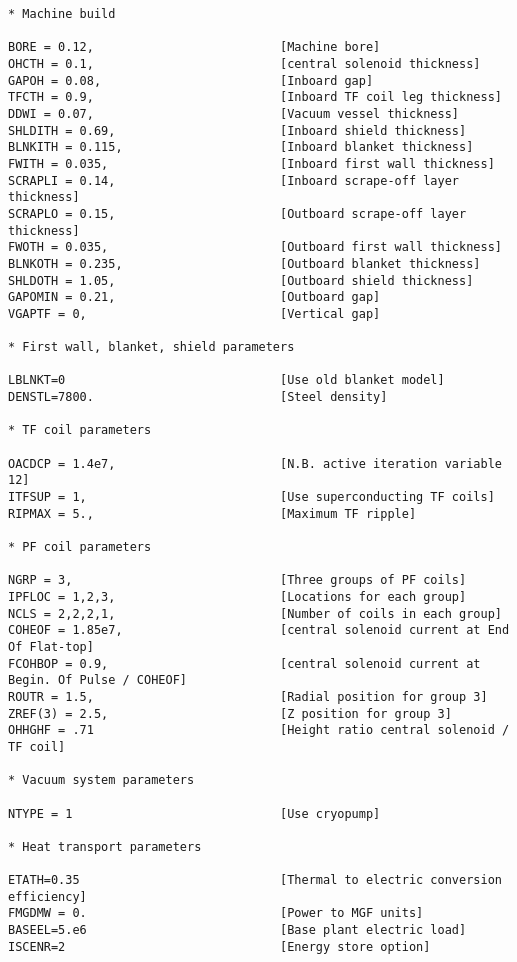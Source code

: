 \documentclass[11pt,a4paper]{report}
\begin{document}
\begin{verbatim}
* Machine build

BORE = 0.12,                          [Machine bore]
OHCTH = 0.1,                          [central solenoid thickness]
GAPOH = 0.08,                         [Inboard gap]
TFCTH = 0.9,                          [Inboard TF coil leg thickness]
DDWI = 0.07,                          [Vacuum vessel thickness]
SHLDITH = 0.69,                       [Inboard shield thickness]
BLNKITH = 0.115,                      [Inboard blanket thickness]
FWITH = 0.035,                        [Inboard first wall thickness]
SCRAPLI = 0.14,                       [Inboard scrape-off layer thickness]
SCRAPLO = 0.15,                       [Outboard scrape-off layer thickness]
FWOTH = 0.035,                        [Outboard first wall thickness]
BLNKOTH = 0.235,                      [Outboard blanket thickness]
SHLDOTH = 1.05,                       [Outboard shield thickness]
GAPOMIN = 0.21,                       [Outboard gap]
VGAPTF = 0,                           [Vertical gap]

* First wall, blanket, shield parameters

LBLNKT=0                              [Use old blanket model]
DENSTL=7800.                          [Steel density]

* TF coil parameters

OACDCP = 1.4e7,                       [N.B. active iteration variable 12]
ITFSUP = 1,                           [Use superconducting TF coils]
RIPMAX = 5.,                          [Maximum TF ripple]

* PF coil parameters

NGRP = 3,                             [Three groups of PF coils]
IPFLOC = 1,2,3,                       [Locations for each group]
NCLS = 2,2,2,1,                       [Number of coils in each group]
COHEOF = 1.85e7,                      [central solenoid current at End Of Flat-top]
FCOHBOP = 0.9,                        [central solenoid current at Begin. Of Pulse / COHEOF]
ROUTR = 1.5,                          [Radial position for group 3]
ZREF(3) = 2.5,                        [Z position for group 3]
OHHGHF = .71                          [Height ratio central solenoid / TF coil]

* Vacuum system parameters

NTYPE = 1                             [Use cryopump]

* Heat transport parameters

ETATH=0.35                            [Thermal to electric conversion efficiency]
FMGDMW = 0.                           [Power to MGF units]
BASEEL=5.e6                           [Base plant electric load]
ISCENR=2                              [Energy store option]


\end{verbatim}
\end{document}
